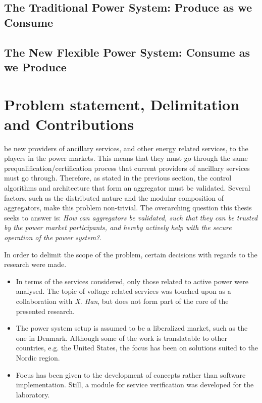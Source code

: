 \subsection*{The Traditional Power System: Produce as we Consume}
\label{sub:traditional}

\subsection*{The New Flexible Power System: Consume as we Produce}
\label{sub:future}


\section{Problem statement, Delimitation and Contributions} %
\label{sec:funneling}
 be new providers of ancillary services, and other energy related services, to the players in the power markets. This means that they must go through the same prequalification/certification process that current providers of ancillary services must go through. Therefore, as stated in the previous section, the control algorithms and architecture that form an aggregator must be validated. Several factors, such as the distributed nature and the modular composition of aggregators, make this problem non-trivial. The overarching question this thesis seeks to answer is: \emph{How can aggregators be validated, such that they can be trusted by the power market participants, and hereby actively help with the secure operation of the power system?}.

In order to delimit the scope of the problem, certain decisions with regards to the research were made.
\begin{itemize}
	\item In terms of the services considered, only those related to active power were analysed. The topic of voltage related services was touched upon as a collaboration with \emph{X. Han}, but does not form part of the core of the presented research.
	\item The power system setup is assumed to be a liberalized market, such as the one in Denmark. Although some of the work is translatable to other countries, e.g. the United States, the focus has been on solutions suited to the Nordic region.
	\item Focus has been given to the development of concepts rather than software implementation. Still, a module for service verification was developed for the laboratory.
\end{itemize}

